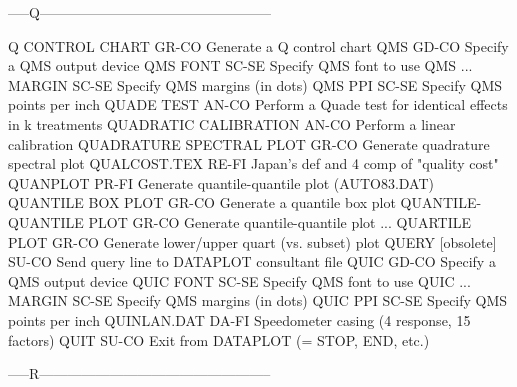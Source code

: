 -----Q--------------------------------------------------

Q CONTROL CHART             GR-CO Generate a Q control chart
QMS                         GD-CO Specify a QMS output device
QMS FONT                    SC-SE Specify QMS font to use
QMS ... MARGIN              SC-SE Specify QMS margins (in dots)
QMS PPI                     SC-SE Specify QMS points per inch
QUADE TEST                  AN-CO Perform a Quade test for identical effects in k treatments
QUADRATIC CALIBRATION       AN-CO Perform a linear calibration
QUADRATURE SPECTRAL PLOT    GR-CO Generate quadrature spectral plot
QUALCOST.TEX                RE-FI Japan's def and 4 comp of "quality cost"
QUANPLOT                    PR-FI Generate quantile-quantile plot (AUTO83.DAT)
QUANTILE BOX PLOT           GR-CO Generate a quantile box plot
QUANTILE-QUANTILE PLOT      GR-CO Generate quantile-quantile plot
... QUARTILE PLOT           GR-CO Generate lower/upper quart (vs. subset) plot
QUERY [obsolete]            SU-CO Send query line to DATAPLOT consultant file
QUIC                        GD-CO Specify a QMS output device
QUIC FONT                   SC-SE Specify QMS font to use
QUIC ... MARGIN             SC-SE Specify QMS margins (in dots)
QUIC PPI                    SC-SE Specify QMS points per inch
QUINLAN.DAT                 DA-FI Speedometer casing (4 response, 15 factors)
QUIT                        SU-CO Exit from DATAPLOT (= STOP, END, etc.)

-----R--------------------------------------------------

